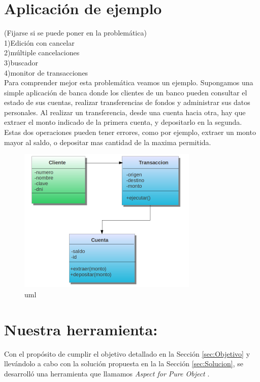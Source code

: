 \section{Aplicación de ejemplo}
(Fijarse si se puede poner en la problemática)\\
1)Edición con cancelar\\
2)múltiple cancelaciones\\
3)buscador\\
4)monitor de transacciones\\

Para comprender mejor esta problemática veamos un ejemplo. Supongamos una simple
aplicación de banca donde los clientes de un banco pueden consultar el estado de sus
cuentas, realizar transferencias de fondos y administrar sus datos personales.
Al realizar un transferencia, desde una cuenta hacia otra, hay que extraer el
monto indicado de la primera cuenta, y depositarlo en la segunda. Estas dos
operaciones pueden tener errores, como por ejemplo, extraer un monto mayor al
saldo, o depositar mas cantidad de la maxima permitida.

		\begin{figure}[h]
			\includegraphics{img/objectTransaction}
			\caption{uml}
			\label{uml}
		\end{figure}	
	



\section{Nuestra herramienta: }

Con el propósito de cumplir el objetivo detallado en la Sección
\ref{sec:Objetivo} y llevándolo a cabo con la solución propuesta en la  la
Sección \ref{sec:Solucion}, se desarrolló una herramienta que llamamos
\emph{Aspect for Pure Object }.

